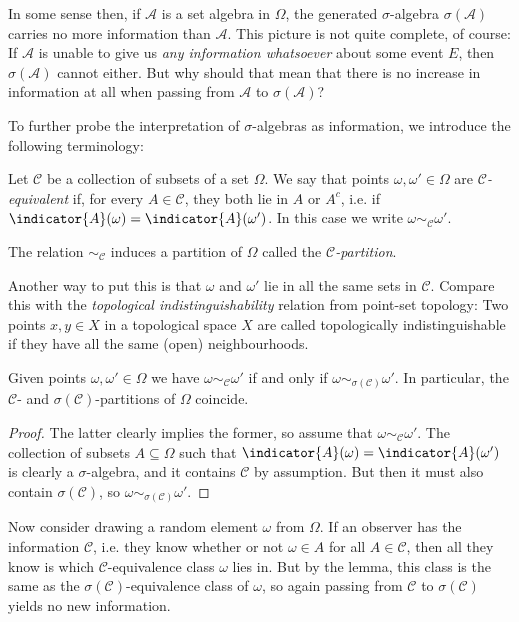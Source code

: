 \documentclass[article, a4paper, 11pt, oneside]{memoir}
\numberwithin{equation}{chapter}
\newcommand{\calA}{\mathcal{A}}
\newcommand{\calC}{\mathcal{C}}
\begin{document}
In some sense then, if $\calA$ is a set algebra in $\Omega$, the generated $\sigma$-algebra $\sigma(\calA)$ carries no more information than $\calA$. This picture is not quite complete, of course: If $\calA$ is unable to give us \emph{any information whatsoever} about some event $E$, then $\sigma(\calA)$ cannot either. But why should that mean that there is no increase in information at all when passing from $\calA$ to $\sigma(\calA)$?

To further probe the interpretation of $\sigma$-algebras as information, we introduce the following terminology:

\begin{definition}
    Let $\calC$ be a collection of subsets of a set $\Omega$. We say that points $\omega, \omega' \in \Omega$ are \emph{$\calC$-equivalent} if, for every $A \in \calC$, they both lie in $A$ or $A^c$, i.e. if $\indicator{A}(\omega) = \indicator{A}(\omega')$. In this case we write $\omega \sim_\calC \omega'$.

    The relation $\sim_\calC$ induces a partition of $\Omega$ called the \emph{$\calC$-partition}.
\end{definition}
%
Another way to put this is that $\omega$ and $\omega'$ lie in all the same sets in $\calC$. Compare this with the \emph{topological indistinguishability} relation from point-set topology: Two points $x,y \in X$ in a topological space $X$ are called topologically indistinguishable if they have all the same (open) neighbourhoods.

\begin{lemma}
    Given points $\omega, \omega' \in \Omega$ we have $\omega \sim_\calC \omega'$ if and only if $\omega \sim_{\sigma(\calC)} \omega'$. In particular, the $\calC$- and $\sigma(\calC)$-partitions of $\Omega$ coincide.
\end{lemma}

\begin{proof}
    The latter clearly implies the former, so assume that $\omega \sim_\calC \omega'$. The collection of subsets $A \subseteq \Omega$ such that $\indicator{A}(\omega) = \indicator{A}(\omega')$ is clearly a $\sigma$-algebra, and it contains $\calC$ by assumption. But then it must also contain $\sigma(\calC)$, so $\omega \sim_{\sigma(\calC)} \omega'$.
\end{proof}
%
Now consider drawing a random element $\omega$ from $\Omega$. If an observer has the information $\calC$, i.e. they know whether or not $\omega \in A$ for all $A \in \calC$, then all they know is which $\calC$-equivalence class $\omega$ lies in. But by the lemma, this class is the same as the $\sigma(\calC)$-equivalence class of $\omega$, so again passing from $\calC$ to $\sigma(\calC)$ yields no new information.
\end{document}

